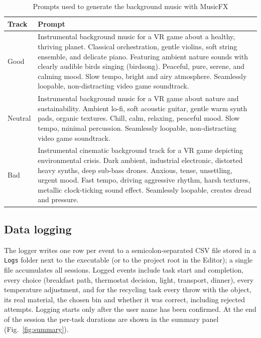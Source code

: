 \documentclass[conference]{IEEEtran}
\begin{document}
\begin{table}[htbp]
\caption{Prompts used to generate the background music with MusicFX}
\label{tab:prompts}
\begin{center}
\footnotesize
\begin{tabular}{|l|p{5.3cm}|}
\hline
\textbf{Track} & \textbf{Prompt} \\
\hline
Good & Instrumental background music for a VR game about a healthy, thriving planet. Classical orchestration, gentle violins, soft string ensemble, and delicate piano. Featuring ambient nature sounds with clearly audible birds singing (birdsong). Peaceful, pure, serene, and calming mood. Slow tempo, bright and airy atmosphere. Seamlessly loopable, non-distracting video game soundtrack.
\\
\hline
Neutral & Instrumental background music for a VR game about nature and sustainability. Ambient lo-fi, soft acoustic guitar, gentle warm synth pads, organic textures. Chill, calm, relaxing, peaceful mood. Slow tempo, minimal percussion. Seamlessly loopable, non-distracting video game soundtrack.
\\
\hline
Bad & Instrumental cinematic background track for a VR game depicting environmental crisis. Dark ambient, industrial electronic, distorted heavy synths, deep sub-bass drones. Anxious, tense, unsettling, urgent mood. Fast tempo, driving aggressive rhythm, harsh textures, metallic clock-ticking sound effect. Seamlessly loopable, creates dread and pressure.
\\
\hline
\end{tabular}
\end{center}
\end{table}

\subsection{Data logging}
The logger writes one row per event to a semicolon-separated CSV file stored
in a \texttt{Logs} folder next to the executable (or to the project root in the
Editor); a single file accumulates all sessions. Logged events
include task start and completion, every choice (breakfast path, thermostat
decision, light, transport, dinner), every temperature adjustment, and for
the recycling task every throw with the object, its real material, the chosen
bin and whether it was correct, including rejected attempts. Logging starts
only after the user name has been confirmed. At the end of the session the
per-task durations are shown in the summary panel (Fig.~\ref{fig:summary}).
\end{document}
